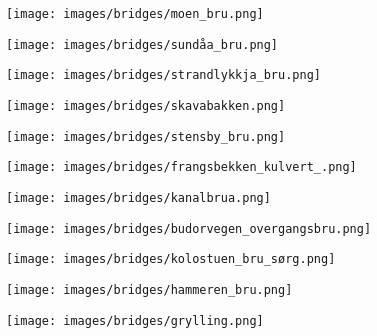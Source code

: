 \begin{figure}[H]
    \centering
    \texttt{[image: images/bridges/moen\_bru.png]}
\end{figure}
            
\begin{figure}[H]
    \centering
    \texttt{[image: images/bridges/sundåa\_bru.png]}
\end{figure}
            
\begin{figure}[H]
    \centering
    \texttt{[image: images/bridges/strandlykkja\_bru.png]}
\end{figure}
            
\begin{figure}[H]
    \centering
    \texttt{[image: images/bridges/skavabakken.png]}
\end{figure}
            
\begin{figure}[H]
    \centering
    \texttt{[image: images/bridges/stensby\_bru.png]}
\end{figure}
            
\begin{figure}[H]
    \centering
    \texttt{[image: images/bridges/frangsbekken\_kulvert\_.png]}
\end{figure}
            
\begin{figure}[H]
    \centering
    \texttt{[image: images/bridges/kanalbrua.png]}
\end{figure}
            
\begin{figure}[H]
    \centering
    \texttt{[image: images/bridges/budorvegen\_overgangsbru.png]}
\end{figure}
            
\begin{figure}[H]
    \centering
    \texttt{[image: images/bridges/kolostuen\_bru\_sørg.png]}
\end{figure}
            
\begin{figure}[H]
    \centering
    \texttt{[image: images/bridges/hammeren\_bru.png]}
\end{figure}
            
\begin{figure}[H]
    \centering
    \texttt{[image: images/bridges/grylling.png]}
\end{figure}
            
